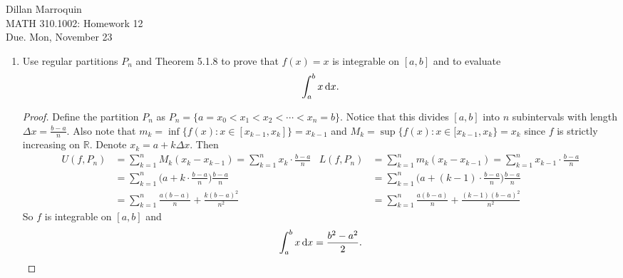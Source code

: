 \documentclass{article}
\begin{document}
    \noindent Dillan Marroquin\\ MATH 310.1002: Homework 12\\
    Due. Mon, November 23

    \begin{enumerate}
        \item Use regular partitions $P_n$ and Theorem 5.1.8 to prove that $f(x) = x$ is integrable on $[a,b]$ and to evaluate
            \[\int_a^b x \dif x.\]
        \begin{proof}
            Define the partition $P_n$ as $P_n = \{a = x_0 < x_1 < x_2 < \cdots < x_n = b \}$. Notice that this divides $[a,b]$ into $n$ subintervals with length $\Delta x = \frac{b-a}{n}$. Also note that $m_k = \inf\{f(x) : x \in [x_{k-1}, x_k]\} = x_{k-1}$ and $M_k = \sup\{f(x) : x \in [x_{k-1}, x_k\} = x_k$ since $f$ is strictly increasing on $\mathbb{R}$. Denote $x_k = a+k\Delta x$. Then
                \begin{align*}
                    U(f, P_n) &= \sum_{k=1}^n M_k(x_k-x_{k-1}) = \sum_{k=1}^n x_k \cdot \frac{b-a}{n}     &    L(f, P_n) &= \sum_{k=1}^n m_k(x_k-x_{k-1}) =  \sum_{k=1}^n x_{k-1} \cdot \frac{b-a}{n}\\
                   &= \sum_{k=1}^n \bigg(a+k \cdot \frac{b-a}{n}\bigg)\frac{b-a}{n}      &       &= \sum_{k=1}^n \bigg(a+(k-1) \cdot \frac{b-a}{n}\bigg)\frac{b-a}{n}\\
                   &= \sum_{k=1}^n \frac{a(b-a)}{n} + \frac{k(b-a)^2}{n^2}     &    &= \sum_{k=1}^n \frac{a(b-a)}{n}+\frac{(k-1)(b-a)^2}{n^2}   
                \end{align*}
            So $f$ is integrable on $[a,b]$ and
                \[\int_a^b x \dif x = \frac{b^2-a^2}{2}.\]
        \end{proof}
        

\end{enumerate}
\end{document}
